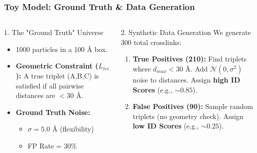 \documentclass[a4paper,8pt]{beamer}
\begin{document}
\begin{frame}
\frametitle{Toy Model: Ground Truth & Data Generation}
\begin{columns}[T] %
    
    \begin{column}{0.5\textwidth}
        \begin{block}{1. The "Ground Truth" Universe}
            \begin{itemize}
                \item 1000 particles in a 100 \AA{} box.
                \item \textbf{Geometric Constraint ($L_{tri}$):}
                A true triplet (A,B,C) is satisfied if all pairwise distances are $< 30$ \AA.
                \item \textbf{Ground Truth Noise:}
                \begin{itemize}
                    \item $\sigma = 5.0$ \AA{} (flexibility)
                    \item FP Rate = 30\%
                \end{itemize}
            \end{itemize}
        \end{block}
    \end{column}
    
    \begin{column}{0.5\textwidth}
        \begin{block}{2. Synthetic Data Generation}
            We generate 300 total crosslinks:
            \begin{enumerate}
                \item \textbf{True Positives (210):}
                Find triplets where $d_{max} < 30$ \AA.
                Add $\mathcal{N}(0, \sigma^2)$ noise to distances.
                Assign \textbf{high ID Scores} (e.g., $\sim 0.85$).
                \item \textbf{False Positives (90):}
                Sample random triplets (no geometry check).
                Assign \textbf{low ID Scores} (e.g., $\sim 0.25$).
            \end{enumerate}
        \end{block}
    \end{column}
    
\end{columns}
\end{frame}
\end{document}
